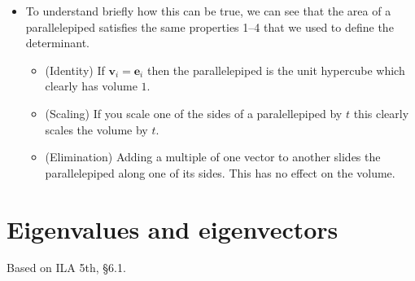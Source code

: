 \documentclass[11pt,oneside]{amsbook}
\theoremstyle{definition}
\theoremstyle{plain}
\theoremstyle{definition}
\theoremstyle{remark}
\numberwithin{equation}{section}
\numberwithin{figure}{section}
\begin{document}
\begin{itemize}
\[\begin{bmatrix}
        |&&|
      \end{bmatrix}\right|
  \]
\item To understand briefly how this can be true, we can see that the area of a parallelepiped satisfies the same properties 1--4 that we used to define the determinant.
  \begin{itemize}
  \item (Identity) If $\mathbf{v}_i=\mathbf{e}_i$ then the parallelepiped is the unit hypercube which clearly has volume $1$.
  \item (Scaling) If you scale one of the sides of a paralellepiped by $t$ this clearly scales the volume by $t$.
  \item (Elimination) Adding a multiple of one vector to another slides the parallelepiped along one of its sides. This has no effect on the volume.
  \end{itemize}
\end{itemize}

\newpage
\section{Eigenvalues and eigenvectors}

Based on ILA 5th, \S 6.1.
\end{document}
